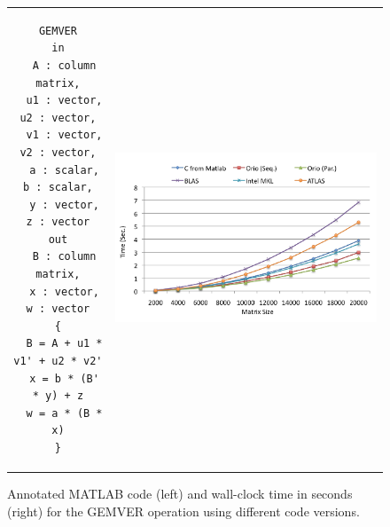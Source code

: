 \documentclass[11pt]{article}
\begin{document}
\begin{figure}[htp]
\centering
\begin{tabular}{cc}
\begin{minipage}[b]{.3\textwidth}
\footnotesize
\begin{verbatim}
GEMVER
in
  A : column matrix,
  u1 : vector, u2 : vector,
  v1 : vector, v2 : vector,
  a : scalar, b : scalar,
  y : vector, z : vector
out
  B : column matrix,
  x : vector, w : vector
{
  B = A + u1 * v1' + u2 * v2'
  x = b * (B' * y) + z
  w = a * (B * x)
}
\end{verbatim}
\end{minipage}
&
\begin{minipage}[b]{.6\textwidth}
\includegraphics[width=\textwidth]{figures/gemver.png}
\end{minipage}\\
\end{tabular}
\caption{Annotated MATLAB code (left) and wall-clock time in seconds (right) for the GEMVER operation using different code versions.}
\label{fig:gemver}
\end{figure}

%
\end{document}
